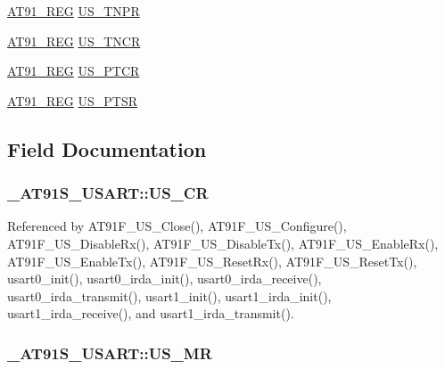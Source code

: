 \begin{CompactItemize}
\item 
\hyperlink{AT91SAM7X256_8h_712ad5a1ac1bd02f3e95a7526c283ce1}{AT91\_\-REG} \hyperlink{struct__AT91S__USART_8f2f0740757a4297aaa4b9f617677526}{US\_\-TNPR}
\item 
\hyperlink{AT91SAM7X256_8h_712ad5a1ac1bd02f3e95a7526c283ce1}{AT91\_\-REG} \hyperlink{struct__AT91S__USART_c561ac4ef04fa503459b5b7a4b393fa9}{US\_\-TNCR}
\item 
\hyperlink{AT91SAM7X256_8h_712ad5a1ac1bd02f3e95a7526c283ce1}{AT91\_\-REG} \hyperlink{struct__AT91S__USART_34f5675243d34c85da1c4e870f0654aa}{US\_\-PTCR}
\item 
\hyperlink{AT91SAM7X256_8h_712ad5a1ac1bd02f3e95a7526c283ce1}{AT91\_\-REG} \hyperlink{struct__AT91S__USART_55b19ad696b4ded0785eb1409da2b4c2}{US\_\-PTSR}
\end{CompactItemize}


\subsection{Field Documentation}
\hypertarget{struct__AT91S__USART_02c84ac26acfbb9621cde9e11e70b3e1}{
\subsubsection{ {\bf \_\-AT91S\_\-USART::US\_\-CR}}}
\label{struct__AT91S__USART_02c84ac26acfbb9621cde9e11e70b3e1}




Referenced by AT91F\_\-US\_\-Close(), AT91F\_\-US\_\-Configure(), AT91F\_\-US\_\-DisableRx(), AT91F\_\-US\_\-DisableTx(), AT91F\_\-US\_\-EnableRx(), AT91F\_\-US\_\-EnableTx(), AT91F\_\-US\_\-ResetRx(), AT91F\_\-US\_\-ResetTx(), usart0\_\-init(), usart0\_\-irda\_\-init(), usart0\_\-irda\_\-receive(), usart0\_\-irda\_\-transmit(), usart1\_\-init(), usart1\_\-irda\_\-init(), usart1\_\-irda\_\-receive(), and usart1\_\-irda\_\-transmit().\hypertarget{struct__AT91S__USART_091b71f9f606a54b115910aed19d5416}{
\subsubsection{ {\bf \_\-AT91S\_\-USART::US\_\-MR}}}
\label{struct__AT91S__USART_091b71f9f606a54b115910aed19d5416}




